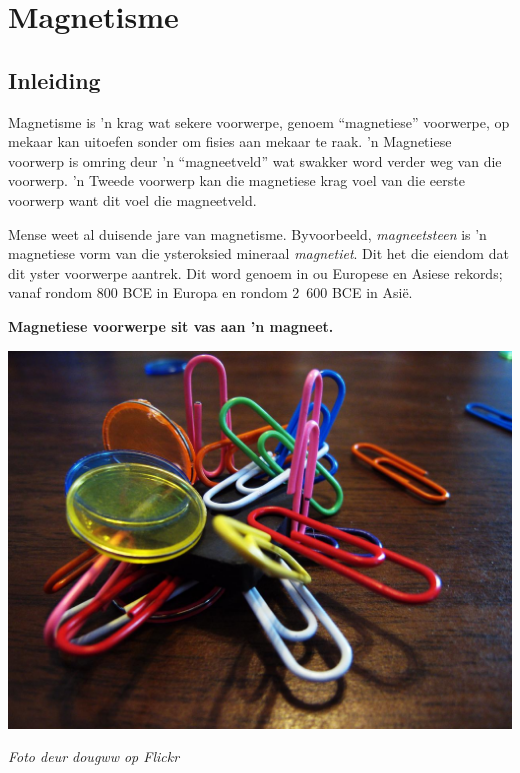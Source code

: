\chapter{Magnetisme}
    

\label{m37830}
    \section{Inleiding}

\begin{minipage}{.5\textwidth}

Magnetisme is 'n krag wat sekere voorwerpe, genoem ``magnetiese'' voorwerpe, op mekaar kan uitoefen sonder om fisies aan mekaar te raak. 'n Magnetiese voorwerp is omring deur 'n ``magneetveld'' wat swakker word verder weg van die voorwerp. 'n Tweede voorwerp kan die magnetiese krag voel van die eerste voorwerp want dit voel die magneetveld.


Mense weet al duisende jare van magnetisme. Byvoorbeeld, \textsl{magneetsteen} is 'n magnetiese vorm van die ysteroksied mineraal \textsl{magnetiet}. Dit het die eiendom dat dit yster voorwerpe aantrek. Dit word genoem in ou Europese en Asiese rekords; vanaf rondom 800 \textsc{BCE} in Europa en rondom 2~600 \textsc{BCE} in Asi\"e. \par


\end{minipage}
\begin{minipage}{.5\textwidth}
\begin{center}
\textbf{Magnetiese voorwerpe sit vas aan 'n magneet.}\par
 \includegraphics[width=.8\textwidth]{photos/magnet_mess_dougww.jpg}\par
\textit{Foto deur dougww op Flickr}
\end{center}
\end{minipage}
 
